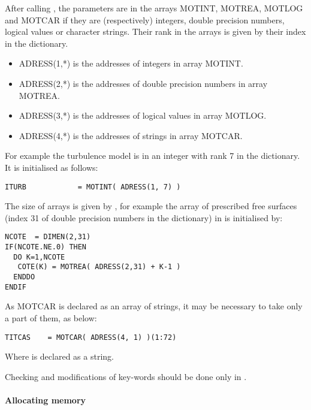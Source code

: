 After calling , the parameters are in the arrays MOTINT,
MOTREA, MOTLOG and MOTCAR if they are (respectively) integers, double precision
numbers, logical values or character strings. Their rank in the arrays is given
by their index in the dictionary.

\begin{itemize}
  \item ADRESS(1,*) is the addresses of integers in array MOTINT.
  \item ADRESS(2,*) is the addresses of double precision numbers in array
    MOTREA.
  \item ADRESS(3,*) is the addresses of logical values in array MOTLOG.
  \item ADRESS(4,*) is the addresses of strings in array MOTCAR.
\end{itemize}

For example the turbulence model is in  an integer with rank 7 in
the dictionary. It is initialised as follows:
\begin{lstlisting}[language=TelFortran]
ITURB            = MOTINT( ADRESS(1, 7) )
\end{lstlisting}

The size of arrays is given by , for example the array of
prescribed free surfaces (index 31 of double precision  numbers in the
dictionary) in  is initialised by:
\begin{lstlisting}[language=TelFortran]
NCOTE  = DIMEN(2,31)
IF(NCOTE.NE.0) THEN
  DO K=1,NCOTE
   COTE(K) = MOTREA( ADRESS(2,31) + K-1 )
  ENDDO
ENDIF
\end{lstlisting}

As MOTCAR is declared as an array of  strings, it
may be necessary to take only a part of them, as below:
\begin{lstlisting}[language=TelFortran]
TITCAS    = MOTCAR( ADRESS(4, 1) )(1:72)
\end{lstlisting}

Where  is declared as a  string.

Checking and modifications of key-words should be done only in .

\paragraph{Allocating memory}


